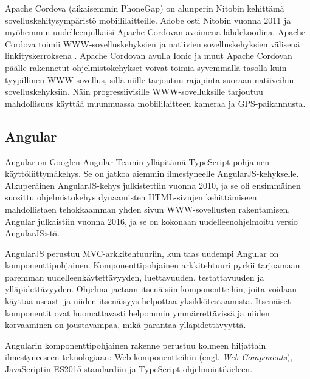 \documentclass[utf8]{gradu3}
\begin{document}
Apache Cordova (aikaisemmin PhoneGap) on alunperin Nitobin kehittämä sovelluskehitysympäristö mobiililaitteille. Adobe osti Nitobin vuonna 2011 ja myöhemmin uudelleenjulkaisi Apache Cordovan avoimena lähdekoodina. Apache Cordova toimii WWW-sovelluskehyksien ja natiivien sovelluskehyksien välisenä linkityskerroksena \parencite[]{ionic-framework-hybrid}. Apache Cordovan avulla Ionic ja muut Apache Cordovan päälle rakennetut ohjelmistokehykset voivat toimia syvemmällä tasolla kuin tyypillinen WWW-sovellus, sillä niille tarjoutuu rajapinta suoraan natiiveihin sovelluskehyksiin. Näin progressiivisille WWW-sovelluksille tarjoutuu mahdollisuus käyttää muunmuassa mobiililaitteen kameraa ja GPS-paikannusta.

\subsection{Angular}

Angular on Googlen Angular Teamin ylläpitämä TypeScript-pohjainen käyttöliittymäkehys. Se on jatkoa aiemmin ilmestyneelle AngularJS-kehykselle. Alkuperäinen AngularJS-kehys julkistettiin vuonna 2010, ja se oli ensimmäinen suosittu ohjelmistokehys dynaamisten HTML-sivujen kehittämiseen mahdollistaen tehokkaamman yhden sivun WWW-sovellusten rakentamisen. Angular julkaistiin vuonna 2016, ja se on kokonaan uudelleenohjelmoitu versio AngularJS:stä.

AngularJS perustuu MVC-arkkitehtuuriin, kun taas uudempi Angular on komponenttipohjainen. Komponenttipohjainen arkkitehtuuri pyrkii tarjoamaan paremman uudelleenkäytettävyyden, luettavuuden, testattavuuden ja ylläpidettävyyden. Ohjelma jaetaan itsenäisiin komponentteihin, joita voidaan käyttää useasti ja niiden itsenäisyys helpottaa yksikkötestaamista. Itsenäiset komponentit ovat huomattavasti helpommin ymmärrettävissä ja niiden korvaaminen on joustavampaa, mikä parantaa ylläpidettävyyttä. \parencite[]{good-and-bad-angular} 

Angularin komponenttipohjainen rakenne perustuu kolmeen hiljattain ilmestyneeseen teknologiaan: Web-komponentteihin (engl. \textit{Web Components}), JavaScriptin ES2015-standardiin ja TypeScript-ohjelmointikieleen.
\end{document}
